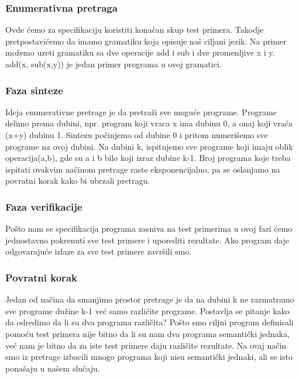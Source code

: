 \subsubsection{Enumerativna pretraga}
\label{subsec:enumerativnaPretragaCegis}

Ovde ćemo za specifikaciju koristiti konačan skup test primera. Takodje pretpostavićemo da imamo gramatiku koja opisuje naš ciljani jezik. Na primer možemo uzeti gramatiku sa dve operacije add i sub i dve promenljive x i y. add(x, sub(x,y)) je jedan primer programa u ovoj gramatici.

\subsubsection*{Faza sinteze}

Ideja enumerativne pretrage je da pretraži sve moguće programe. Programe delimo prema dubini, npr. program koji vraca x ima dubinu 0, a onaj koji vraća (x+y) dubinu 1.
Sintezu počinjemo od dubine 0 i pritom numerišemo sve programe na ovoj dubini. Na dubini k, ispitujemo sve programe koji imaju oblik operacija(a,b), gde su a i b bilo koji izraz dubine k-1. Broj programa koje treba ispitati ovakvim načinom pretrage raste eksponencijalno, pa se oslanjamo na povratni korak kako bi ubrzali pretragu.

\subsubsection*{Faza verifikacije} 
Pošto nam se specifikacija programa zasniva na test primerima u ovoj fazi ćemo jednostavno pokrenuti sve test primere i uporediti rezultate. Ako program daje odgovarajuće izlaze za sve test primere završili smo.

\subsubsection*{Povratni korak}

Jedan od načina da smanjimo prostor pretrage je da na dubini k ne razmatramo sve programe dužine k-1 već samo različite programe. Postavlja se pitanje kako da odredimo da li su dva programa različita? Pošto smo ciljni program definisali pomoću test primera nije bitno da li su nam dva programa semantički jednaka, već nam je bitno da  za iste test primere daju različite rezultate. Na ovaj način smo iz pretrage izbacili mnogo programa koji nisu
semantički jednaki, ali se isto ponašaju u našem slučaju.
